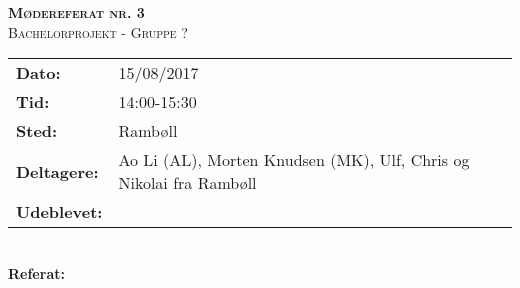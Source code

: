 
\newcommand{\HRule}{\rule{\linewidth}{0.1mm}}


	\begin{center}
		{\huge \bfseries \textsc{Mødereferat nr. 3}}\\
		\textsc{\large Bachelorprojekt - Gruppe ?}\\[0.3cm]
	\end{center}
	\begin{tabular}{ll}
	\large \textbf{Dato:} & 15/08/2017  	\\ %
	\large \textbf{Tid:}  & 14:00-15:30 	\\ %
	\large \textbf{Sted:} & Rambøll		\\ %
	\large \textbf{Deltagere:} & Ao Li (AL), Morten Knudsen (MK), Ulf, Chris og Nikolai fra Rambøll \\
	\large \textbf{Udeblevet:}
	\end{tabular}\\
	\phantom{\,}\hspace{0.1em} \large \textbf{Referat:}
